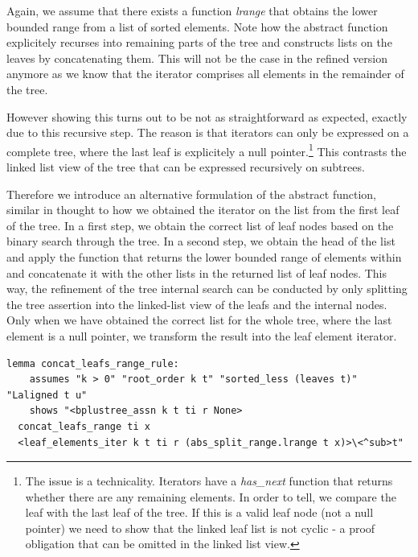 \documentclass[a4paper,UKenglish,cleveref, autoref, thm-restate]{lipics-v2021}
\begin{document}
Again, we assume that there exists a function \textit{lrange} that
obtains the lower bounded range from a list of sorted elements.
Note how the abstract function explicitely recurses into
remaining parts of the tree and constructs lists on the leaves by concatenating them.
This will not be the case in the refined version anymore
as we know that the iterator comprises all elements in the remainder of the tree.

However showing this turns out to be not as straightforward
as expected, exactly due to this recursive step.
The reason is that iterators can only be expressed on a complete tree,
where the last leaf is explicitely a null pointer.\footnote{
    The issue is a technicality. Iterators have a \textit{has\_next} function
    that returns whether there are any remaining elements.
    In order to tell, we compare the leaf with the last leaf of the tree.
    If this is a valid leaf node (not a null pointer) we need to show
    that the linked leaf list is not cyclic - a proof obligation
    that can be omitted in the linked list view.
}
This contrasts the linked list view of the tree that can be expressed
recursively on subtrees.

Therefore we introduce an alternative formulation of the
abstract function, similar in thought to how we obtained the iterator
on the list from the first leaf of the tree.
In a first step, we obtain the correct list of leaf nodes
based on the binary search through the tree.
In a second step, we obtain the head of the list and apply
the function that returns the lower bounded range of elements within
and concatenate it with the other lists in the returned list of leaf nodes.
This way, the refinement of the tree internal search
can be conducted by only splitting the tree assertion into the linked-list view of the leafs
and the internal nodes.
Only when we have obtained the correct list for the whole tree,
where the last element is a null pointer,
we transform the result into the leaf element iterator.

\begin{lstlisting}[mathescape=true, language=Isabelle,label=lst:btree-leafs-range]
lemma concat_leafs_range_rule:
    assumes "k > 0" "root_order k t" "sorted_less (leaves t)" "Laligned t u"
    shows "<bplustree_assn k t ti r None>
  concat_leafs_range ti x
  <leaf_elements_iter k t ti r (abs_split_range.lrange t x)>\<^sub>t"
\end{lstlisting}

\end{document}
